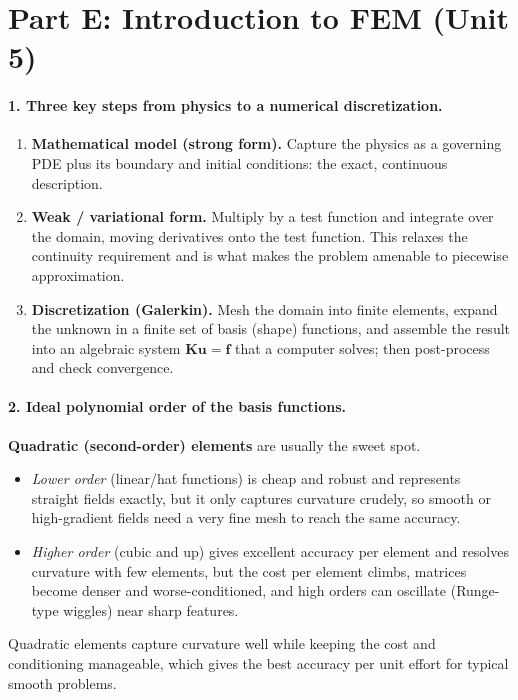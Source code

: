 \section*{Part E: Introduction to FEM (Unit 5)}

\paragraph{1. Three key steps from physics to a numerical discretization.}
\begin{enumerate}[nosep,leftmargin=1.6em]
\item \textbf{Mathematical model (strong form).} Capture the physics as a governing PDE plus its
boundary and initial conditions: the exact, continuous description.
\item \textbf{Weak / variational form.} Multiply by a test function and integrate over the domain,
moving derivatives onto the test function. This relaxes the continuity requirement and is what makes
the problem amenable to piecewise approximation.
\item \textbf{Discretization (Galerkin).} Mesh the domain into finite elements, expand the unknown in
a finite set of basis (shape) functions, and assemble the result into an algebraic system
$\mathbf{K}\mathbf{u}=\mathbf{f}$ that a computer solves; then post-process and check convergence.
\end{enumerate}

\paragraph{2. Ideal polynomial order of the basis functions.}
\textbf{Quadratic (second-order) elements} are usually the sweet spot.
\begin{itemize}[nosep,leftmargin=1.6em]
\item \emph{Lower order} (linear/hat functions) is cheap and robust and represents straight fields
exactly, but it only captures curvature crudely, so smooth or high-gradient fields need a very fine
mesh to reach the same accuracy.
\item \emph{Higher order} (cubic and up) gives excellent accuracy per element and resolves curvature
with few elements, but the cost per element climbs, matrices become denser and worse-conditioned, and
high orders can oscillate (Runge-type wiggles) near sharp features.
\end{itemize}
Quadratic elements capture curvature well while keeping the cost and conditioning manageable, which
gives the best accuracy per unit effort for typical smooth problems.

